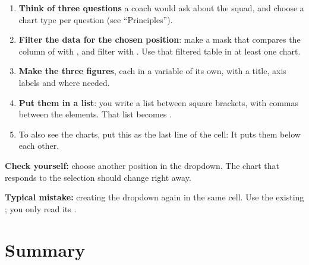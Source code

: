 \documentclass[11pt,a4paper]{article}
\begin{document}
\begin{enumerate}
  \item \textbf{Think of three questions} a coach would ask about the
        squad, and choose a chart type per question (see ``Principles'').
  \item \textbf{Filter the data for the chosen position}: make a mask that
        compares the  column of  with
        , and filter with .
        Use that filtered table in at least one chart.
  \item \textbf{Make the three figures}, each in a variable of its own,
        with a title, axis labels and  where needed.
  \item \textbf{Put them in a list}: you write a list between square
        brackets, with commas between the elements. That list becomes
        .
  \item To also see the charts, put this as the last line of the cell:\newline
        \newline It puts them below each other.
\end{enumerate}

\textbf{Check yourself:} choose another position in the dropdown. The
chart that responds to the selection should change right away.

\textbf{Typical mistake:} creating the dropdown again in the same cell.
Use the existing ; you only read its
.

\section{Summary}
\end{document}
